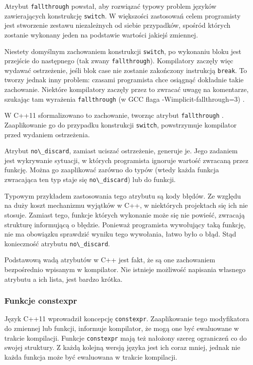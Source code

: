 Atrybut \lstinline{fallthrough} powstał, aby rozwiązać typowy problem języków zawierających konstrukcję \lstinline{switch}. W większości zastosowań celem programisty jest stworzenie zestawu niezależnych od siebie przypadków, spośród których zostanie wykonany jeden na podstawie wartości jakiejś zmiennej.\par
Niestety domyślnym zachowaniem konstrukcji \lstinline{switch}, po wykonaniu bloku jest przejście do następnego (tak zwany \lstinline{fallthrough}). Kompilatory zaczęły więc wydawać ostrzeżenie, jeśli blok case nie zostanie zakończony instrukcją \lstinline{break}. To tworzy jednak inny problem: czasami programista chce osiągnąć dokładnie takie zachowanie. Niektóre kompilatory zaczęły przez to zwracać uwagę na komentarze, szukając tam wyrażenia \lstinline{fallthrough} (w GCC flaga -Wimplicit-fallthrough=3) \cite{gcc_warnings}.\par
W C++11 sformalizowano to zachowanie, tworząc atrybut \lstinline{fallthrough} \cite{ISO:2012:III}. Zaaplikowanie go do przypadku konstrukcji \lstinline{switch}, powstrzymuje kompilator przed wydaniem ostrzeżenia.\par
Atrybut \lstinline{no\_discard}, zamiast uciszać ostrzeżenie, generuje je. Jego zadaniem jest wykrywanie sytuacji, w których programista ignoruje wartość zwracaną przez funkcję. Można go zaaplikować zarówno do typów (wtedy każda funkcja zwracająca ten typ staje się \lstinline{no\_discard}) lub do funkcji.\par
Typowym przykładem zastosowania tego atrybutu są kody błędów. Ze względu na duży koszt mechanizmu wyjątków w C++, w niektórych projektach się ich nie stosuje. Zamiast tego, funkcje których wykonanie może się nie powieść, zwracają strukturę informującą o błędzie. Ponieważ programista wywołujący taką funkcję, nie ma obowiązku sprawdzić wyniku tego wywołania, łatwo było o błąd. Stąd konieczność atrybutu \lstinline{no\_discard}.

Podstawową wadą atrybutów w C++ jest fakt, że są one zachowaniem bezpośrednio wpisanym w kompilator. Nie istnieje możliwość napisania własnego atrybutu a ich lista, jest bardzo krótka.\par
\subsubsection{Funkcje constexpr}
Język C++11 wprowadził koncepcję \lstinline{constexpr}. Zaaplikowanie tego modyfikatora do zmiennej lub funkcji, informuje kompilator, że mogą one być ewaluowane w trakcie kompilacji. Funkcje \lstinline{constexpr} mają też nałożony szereg ograniczeń co do swojej struktury. Z każdą kolejną wersją języka jest ich coraz mniej, jednak nie każda funkcja może być ewaluowana w trakcie kompilacji.

